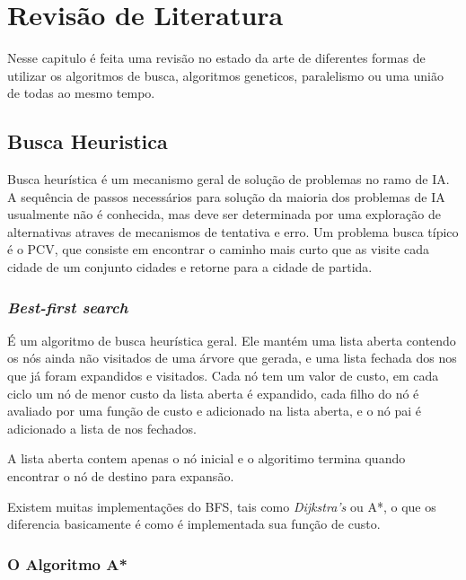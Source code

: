 \chapter[Revisão de Literatura]{Revisão de Literatura}


Nesse capitulo é feita uma revisão no estado da arte de diferentes formas de utilizar os algoritmos de busca, algoritmos geneticos, paralelismo ou uma união de todas ao mesmo tempo.

\section{Busca Heuristica}

Busca heurística é um mecanismo geral de solução de problemas no ramo de IA. A sequência de passos necessários para solução da maioria dos problemas de IA usualmente não é conhecida, mas deve ser determinada por uma exploração de alternativas atraves de mecanismos de tentativa e erro. Um problema busca típico é o PCV, que consiste em encontrar o caminho mais curto que as visite cada cidade de um conjunto cidades e retorne para a cidade de partida.

\subsection{\textit{Best-first search}}

É um algoritmo de busca heurística geral. Ele mantém uma lista aberta contendo os nós ainda não visitados de uma árvore que gerada, e uma lista fechada dos nos que já foram expandidos e visitados. Cada nó tem um valor de custo, em cada ciclo um nó de menor custo da lista aberta é expandido, cada filho do nó é avaliado por uma função de custo e adicionado na lista aberta, e o nó pai é adicionado a lista de nos fechados. 

A lista aberta contem apenas o nó inicial e o algoritimo termina quando encontrar o nó de destino para expansão.\cite{KORF199341}

Existem muitas implementações do BFS, tais como \textit{Dijkstra's} ou A*, o que os diferencia basicamente é como é implementada sua função de custo.

\subsection{O Algoritmo A*}

